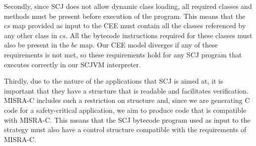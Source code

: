 Secondly, since SCJ does not allow dynamic class loading, all required
classes and methods must be present before execution of the program.
This means that the $cs$ map provided as input to the CEE must contain
all the classes referenced by any other class in $cs$.
All the bytecode instructions required for these classes must also be
present in the $bc$ map.
Our CEE model diverges if any of these requirements is not met, so
these requirements hold for any SCJ program that executes correctly in
our SCJVM interpreter.

Thirdly, due to the nature of the applications that SCJ is aimed at,
it is important that they have a structure that is readable and
facilitates verification.
MISRA-C includes such a restriction on structure and, since we are
generating C code for a safety-critical application, we aim to produce
code that is compatible with MISRA-C.
This means that the SCJ bytecode program used as input to the strategy
must also have a control structure compatible with the requirements of
MISRA-C.

